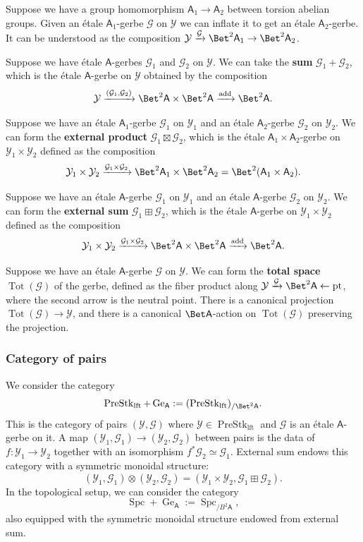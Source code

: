 \documentclass[10pt]{amsart}
\newcommand{\sssec}{\subsubsection}
\theoremstyle{remark}
\newcommand{\te}{\text}
\newcommand{\on}{\operatorname}
\newcommand{\cG}{\mathcal{G}}
\newcommand{\cY}{\mathcal{Y}}
\newcommand{\PreStklft}{\on{PreStk}_{\on{lft}}}
\newcommand{\Spc}{\on{Spc}}
\newcommand{\pt}{\on{pt}}
\newcommand{\sfA}{\mathsf{A}}
\begin{document}
Suppose we have a group homomorphism $\sfA_1\rightarrow\sfA_2$ between torsion abelian groups. Given an \'etale $\sfA_1$-gerbe $\cG$ on $\cY$ we can inflate it to get an \'etale $\sfA_2$-gerbe. It can be understood as the composition $\cY\xrightarrow{\cG}\Bet^2 \sfA_1\rightarrow \Bet^2 \sfA_2$.
\medskip

Suppose we have \'etale $\sfA$-gerbes $\cG_1$ and $\cG_2$ on $\cY$. We can take the \textbf{sum} $\cG_1+ \cG_2$, which is the \'etale $\sfA$-gerbe on $\cY$ obtained by the composition
\[\cY\xrightarrow{(\cG_1,\cG_2)}\Bet^2\sfA\times\Bet^2\sfA\xrightarrow{\te{add}}\Bet^2\sfA.\]

Suppose we have an \'etale $\sfA_1$-gerbe $\cG_1$ on $\cY_1$ and an \'etale $\sfA_2$-gerbe $\cG_2$ on $\cY_2$. We can form the \textbf{external product} $\cG_1\boxtimes\cG_2$, which is the \'etale $\sfA_1\times\sfA_2$-gerbe on $\cY_1\times\cY_2$ defined as the composition
\[\cY_1\times\cY_2\xrightarrow{\cG_1\times\cG_2}\Bet^2 \sfA_1\times\Bet^2\sfA_2 =\Bet^2(\sfA_1\times\sfA_2).\]

Suppose we have an \'etale $\sfA$-gerbe $\cG_1$ on $\cY_1$ and an \'etale $\sfA$-gerbe $\cG_2$ on $\cY_2$. We can form the \textbf{external sum} $\cG_1\boxplus\cG_2$, which is the \'etale $\sfA$-gerbe on $\cY_1\times\cY_2$ defined as the composition
\[\cY_1\times\cY_2\xrightarrow{\cG_1\times\cG_2}\Bet^2 \sfA\times\Bet^2\sfA \xrightarrow{\on{add}}\Bet^2\sfA.\]

Suppose we have an \'etale $\sfA$-gerbe $\cG$ on $\cY$. We can form the \textbf{total space} $\on{Tot}(\cG)$ of the gerbe, defined as the fiber product along $\cY\xrightarrow{\cG}\Bet^2\sfA\leftarrow\pt$, where the second arrow is the neutral point. There is a canonical projection $\on{Tot}(\cG)\rightarrow\cY$, and there is a canonical $\Bet \sfA$-action on $\on{Tot}(\cG)$ preserving the projection.

\sssec{Category of pairs}
We consider the category
\[\PreStklft+\on{Ge}_{\sfA}:=(\PreStklft)_{/\Bet^2\sfA}.\]
This is the category of pairs $(\cY,\cG)$ where $\cY\in\PreStklft$ and $\cG$ is an \'etale $\sfA$-gerbe on it. A map $(\cY_1,\cG_1)\rightarrow (\cY_2,\cG_2)$ between pairs is the data of $f:\cY_1\rightarrow\cY_2$ together with an isomorphism $f^*\cG_2\simeq \cG_1$. External sum endows this category with a symmetric monoidal structure:
\[(\cY_1,\cG_1)\otimes(\cY_2,\cG_2)= (\cY_1\times\cY_2,\cG_1\boxplus\cG_2).\]
In the topological setup, we can consider the category
\[\Spc+\on{Ge}_{\sfA}:=\Spc_{/B^2 \sfA},\]
also equipped with the symmetric monoidal structure endowed from external sum.
\end{document}
